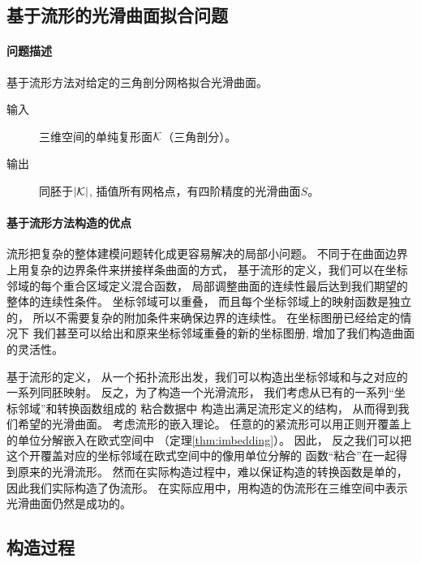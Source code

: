 
\subsection{基于流形的光滑曲面拟合问题}

\paragraph{问题描述}
基于流形方法对给定的三角剖分网格拟合光滑曲面。
%   
\begin{description}
\item[输入] 三维空间的单纯复形面${\cal K}$（三角剖分）。
\item[输出] 同胚于$\lvert {\cal K}\rvert$,
  插值所有网格点，有四阶精度的光滑曲面$S$。
\end{description}

\paragraph{基于流形方法构造的优点}
流形把复杂的整体建模问题转化成更容易解决的局部小问题。
不同于在曲面边界上用复杂的边界条件来拼接样条曲面的方式，
基于流形的定义，我们可以在坐标邻域的每个重合区域定义混合函数，
局部调整曲面的连续性最后达到我们期望的整体的连续性条件。
坐标邻域可以重叠，
而且每个坐标邻域上的映射函数是独立的，
所以不需要复杂的附加条件来确保边界的连续性。
在坐标图册已经给定的情况下
我们甚至可以给出和原来坐标邻域重叠的新的坐标图册,
增加了我们构造曲面的灵活性。


\begin{rem}
  基于流形的定义，
  从一个拓扑流形出发，我们可以构造出坐标邻域和与之对应的一系列同胚映射。
  反之，为了构造一个光滑流形，
  我们考虑从已有的一系列“坐标邻域”和转换函数组成的
  粘合数据\cite{gallier2012parametric}中
  构造出满足流形定义的结构，
  从而得到我们希望的光滑曲面。
  考虑流形的嵌入理论。
  任意的的紧流形可以用正则开覆盖上的单位分解嵌入在欧式空间中
  （定理\ref{thm:imbedding}）。
  因此，
  反之我们可以把这个开覆盖对应的坐标邻域在欧式空间中的像用单位分解的
  函数“粘合”在一起得到原来的光滑流形。
  然而在实际构造过程中，难以保证构造的转换函数是单的，
  因此我们实际构造了伪流形。
  在实际应用中，用构造的伪流形在三维空间中表示光滑曲面仍然是成功的。
\end{rem}

\subsection{构造过程}
\label{sec:gluing}


